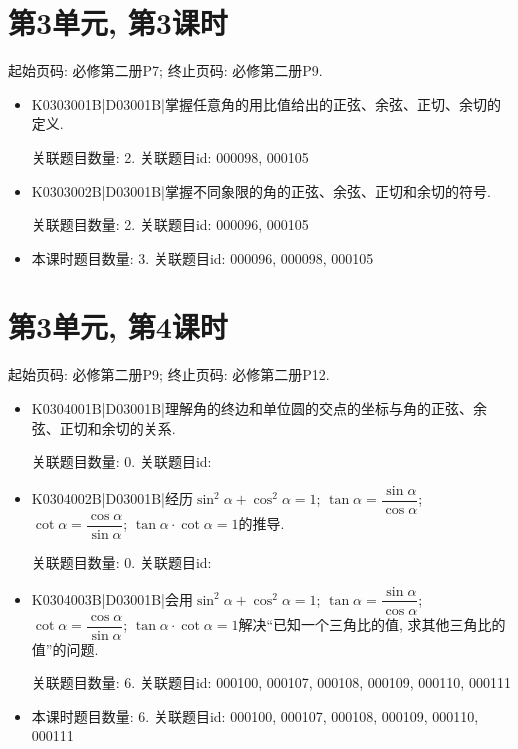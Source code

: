 \section*{第3单元, 第3课时}
起始页码: 必修第二册P7; 终止页码: 必修第二册P9.
\begin{itemize}
\item K0303001B|D03001B|掌握任意角的用比值给出的正弦、余弦、正切、余切的定义.

关联题目数量: 2. 关联题目id: 000098, 000105

\item K0303002B|D03001B|掌握不同象限的角的正弦、余弦、正切和余切的符号.

关联题目数量: 2. 关联题目id: 000096, 000105

\item 本课时题目数量: 3. 关联题目id: 000096, 000098, 000105

\end{itemize}

\section*{第3单元, 第4课时}
起始页码: 必修第二册P9; 终止页码: 必修第二册P12.
\begin{itemize}
\item K0304001B|D03001B|理解角的终边和单位圆的交点的坐标与角的正弦、余弦、正切和余切的关系.

关联题目数量: 0. 关联题目id: 

\item K0304002B|D03001B|经历$\sin^2\alpha+\cos^2\alpha=1$; $\tan\alpha=\dfrac{\sin\alpha}{\cos\alpha}$; $\cot\alpha=\dfrac{\cos\alpha}{\sin\alpha}$; $\tan\alpha\cdot \cot\alpha=1$的推导.

关联题目数量: 0. 关联题目id: 

\item K0304003B|D03001B|会用$\sin^2\alpha+\cos^2\alpha=1$; $\tan\alpha=\dfrac{\sin\alpha}{\cos\alpha}$; $\cot\alpha=\dfrac{\cos\alpha}{\sin\alpha}$; $\tan\alpha\cdot \cot\alpha=1$解决``已知一个三角比的值, 求其他三角比的值''的问题.

关联题目数量: 6. 关联题目id: 000100, 000107, 000108, 000109, 000110, 000111

\item 本课时题目数量: 6. 关联题目id: 000100, 000107, 000108, 000109, 000110, 000111

\end{itemize}

